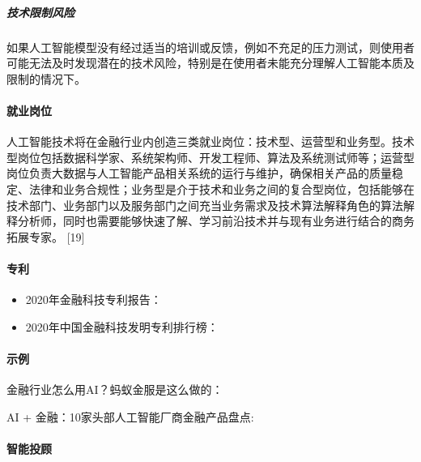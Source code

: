 \documentclass[letterpaper,11pt,english]{sphinxmanual}
\begin{document}
\subparagraph{技术限制风险}
\label{\detokenize{chapter_project/AI_Finance:id25}}
如果人工智能模型没有经过适当的培训或反馈，例如不充足的压力测试，则使用者可能无法及时发现潜在的技术风险，特别是在使用者未能充分理解人工智能本质及限制的情况下。


\paragraph{就业岗位}
\label{\detokenize{chapter_project/AI_Finance:id26}}
人工智能技术将在金融行业内创造三类就业岗位：技术型、运营型和业务型。技术型岗位包括数据科学家、系统架构师、开发工程师、算法及系统测试师等；运营型岗位负责大数据与人工智能产品相关系统的运行与维护，确保相关产品的质量稳定、法律和业务合规性；业务型是介于技术和业务之间的复合型岗位，包括能够在技术部门、业务部门以及服务部门之间充当业务需求及技术算法解释角色的算法解释分析师，同时也需要能够快速了解、学习前沿技术并与现有业务进行结合的商务拓展专家。
{[}19{]}


\paragraph{专利}
\label{\detokenize{chapter_project/AI_Finance:id27}}\begin{itemize}
\item {} 
2020年金融科技专利报告：

\item {} 
2020年中国金融科技发明专利排行榜：

\end{itemize}


\paragraph{示例}
\label{\detokenize{chapter_project/AI_Finance:id28}}
金融行业怎么用AI？蚂蚁金服是这么做的：

AI + 金融：10家头部人工智能厂商金融产品盘点:


\paragraph{智能投顾}
\label{\detokenize{chapter_project/AI_Finance:id29}}
\end{document}

